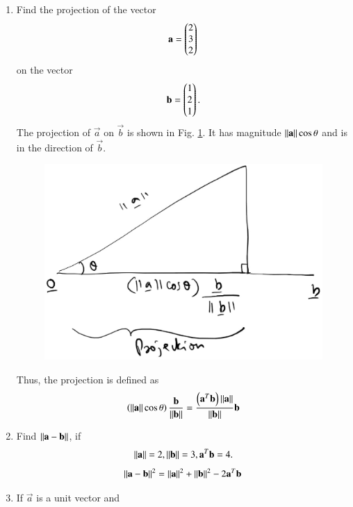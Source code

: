 \begin{enumerate}[label=\arabic*.,ref=\thesubsection.\theenumi]
\item Find the projection of the vector 
\begin{align}
\mathbf{a} = \begin{pmatrix}2\\3\\2\end{pmatrix}
\end{align}
on the vector
\begin{align}
\mathbf{b}=\begin{pmatrix}1\\2\\1\end{pmatrix}.
\end{align}
%
\solution The projection of $\vec{a}$ on $\vec{b}$ is shown in Fig. \ref{fig:line_proj}. It has magnitude $\left\lVert\mathbf{a}\right\rVert\cos \theta$ and is in the direction of $\vec{b}$.
%
%
\begin{figure}
\centering
\includegraphics[width=\columnwidth]{./line/figs/line_proj.eps}
\caption{}
\label{fig:line_proj}
\end{figure}
%
Thus, the projection is defined as 
\begin{align}
\left(\left\lVert\mathbf{a}\right\rVert\cos\theta\right) \frac{\mathbf{b}}{\left\lVert\mathbf{b}\right\rVert}
=  \frac{\left(\mathbf{a}^T\mathbf{b}\right)\left\lVert\mathbf{a}\right\rVert}{\left\lVert\mathbf{b}\right\rVert}\mathbf{b}
\end{align}
\item Find $\left\lVert\mathbf{a}-\mathbf{b}\right\rVert$, if 
\begin{align}
\left\lVert\mathbf{a}\right\rVert = 2, 
\left\lVert\mathbf{b}\right\rVert = 3,
\mathbf{a}^T\mathbf{b} = 4.
\end{align}
%
\solution 
%
\begin{align}
\left\lVert\mathbf{a}-\mathbf{b}\right\rVert^2 = \left\lVert\mathbf{a}\right\rVert^2+\left\lVert\mathbf{b}\right\rVert^2
-2\mathbf{a}^T\mathbf{b}
\end{align}
%
\item If $\vec{a}$ is a unit vector and 

\end{enumerate}
